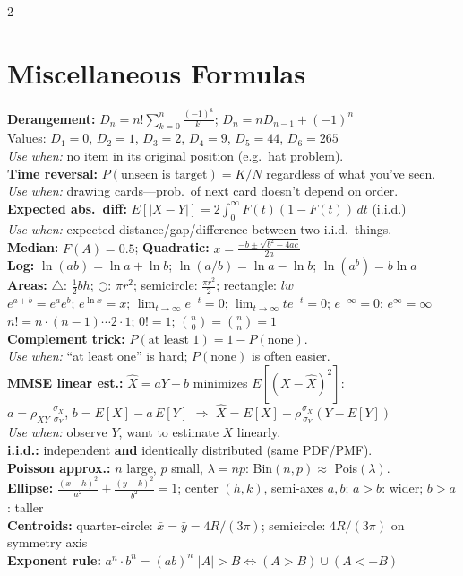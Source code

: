\documentclass[10pt]{article}
\begin{document}
\begin{multicols*}{2}
\section{Miscellaneous Formulas}
\textbf{Derangement:} $D_n = n!\sum_{k=0}^{n} \frac{(-1)^k}{k!}$;\; $D_n = nD_{n-1} + (-1)^n$ \\
Values: $D_1\!=\!0$, $D_2\!=\!1$, $D_3\!=\!2$, $D_4\!=\!9$, $D_5\!=\!44$, $D_6\!=\!265$ \\
\textit{Use when:} no item in its original position (e.g.\ hat problem). \\
\textbf{Time reversal:} $P(\text{unseen is target}) = K/N$ regardless of what you've seen. \\
\textit{Use when:} drawing cards---prob.\ of next card doesn't depend on order. \\
\textbf{Expected abs.\ diff:} $E[|X\!-\!Y|] = 2\int_0^{\infty} F(t)(1\!-\!F(t))\,dt$ (i.i.d.) \\
\textit{Use when:} expected distance/gap/difference between two i.i.d.\ things. \\
\textbf{Median:} $F(A) = 0.5$;\;\; \textbf{Quadratic:} $x = \frac{-b \pm \sqrt{b^2 - 4ac}}{2a}$ \\
\textbf{Log:} $\ln(ab)=\ln a + \ln b$;\; $\ln(a/b) = \ln a - \ln b$;\; $\ln(a^b) = b\ln a$ \\
\textbf{Areas:} $\triangle$: $\frac{1}{2}bh$;\; $\bigcirc$: $\pi r^2$;\; semicircle: $\frac{\pi r^2}{2}$;\; rectangle: $lw$ \\
$e^{a+b}=e^a e^b$;\; $e^{\ln x}=x$;\; $\lim_{t\to\infty} e^{-t}=0$;\; $\lim_{t\to\infty} te^{-t}=0$;\; $e^{-\infty}\!=\!0$;\; $e^{\infty}\!=\!\infty$ \\
$n! = n \cdot (n\!-\!1) \cdots 2 \cdot 1$;\; $0! = 1$;\; $\binom{n}{0} = \binom{n}{n} = 1$ \\
\textbf{Complement trick:} $P(\text{at least 1}) = 1 - P(\text{none})$. \\
\textit{Use when:} ``at least one'' is hard; $P(\text{none})$ is often easier. \\
\textbf{MMSE linear est.:} $\hat{X} = aY + b$ minimizes $E[(X-\hat{X})^2]$: \\
$a = \rho_{XY}\,\frac{\sigma_X}{\sigma_Y}$, \; $b = E[X] - a\,E[Y]$ \;\;$\Rightarrow$\;\;
$\hat{X} = E[X] + \rho\frac{\sigma_X}{\sigma_Y}(Y - E[Y])$ \\
\textit{Use when:} observe $Y$, want to estimate $X$ linearly. \\
\textbf{i.i.d.:} independent \textbf{and} identically distributed (same PDF/PMF). \\
\textbf{Poisson approx.:} $n$ large, $p$ small, $\lambda = np$: Bin$(n,p) \approx$ Pois$(\lambda)$. \\
\textbf{Ellipse:} $\frac{(x-h)^2}{a^2} + \frac{(y-k)^2}{b^2} = 1$;\; center $(h,k)$, semi-axes $a,b$;\; $a>b$: wider;\; $b>a$: taller \\
\textbf{Centroids:} quarter-circle: $\bar{x}=\bar{y}=4R/(3\pi)$;\; semicircle: $4R/(3\pi)$ on symmetry axis \\
\textbf{Exponent rule:} $a^n \cdot b^n = (ab)^n$ \qquad $|A| > B \iff (A > B) \cup (A < -B)$


\end{multicols*}
\end{document}
